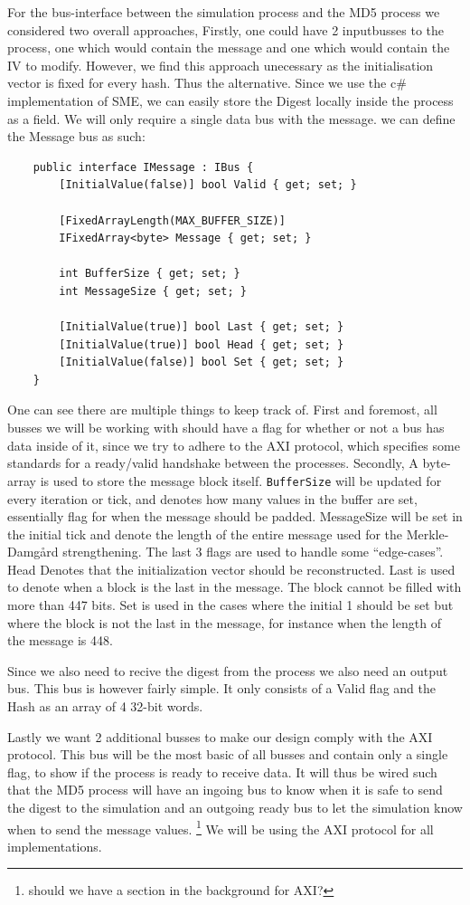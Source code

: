 \documentclass[a4paper]{article}
\begin{document}
For the bus-interface between the simulation process and the MD5 process we considered two overall approaches,
Firstly, one could have 2 inputbusses to the process, one which would contain the message and one which would contain the IV to modify. However, we find this approach unecessary as the initialisation vector is fixed for every hash. Thus the alternative. Since we use the c\# implementation of SME, we can easily store the Digest locally inside the process as a field. We will only require a single data bus with the message. we can define the Message bus as such:
\begin{verbatim}
    public interface IMessage : IBus {
        [InitialValue(false)] bool Valid { get; set; }

        [FixedArrayLength(MAX_BUFFER_SIZE)]
        IFixedArray<byte> Message { get; set; }

        int BufferSize { get; set; }
        int MessageSize { get; set; }

        [InitialValue(true)] bool Last { get; set; }
        [InitialValue(true)] bool Head { get; set; }
        [InitialValue(false)] bool Set { get; set; }
    }
\end{verbatim}
One can see there are multiple things to keep track of. First and foremost, all busses we will be working with should have a flag for whether or not a bus has data inside of it, since we try to adhere to the AXI protocol, which specifies some standards for a ready/valid handshake between the processes. Secondly, A byte-array is used to store the message block itself. \texttt{BufferSize} will be updated for every iteration or tick, and denotes how many values in the buffer are set, essentially flag for when the message should be padded. MessageSize will be set in the initial tick and denote the length of the entire message used for the Merkle-Damgård strengthening.
The last 3 flags are used to handle some ``edge-cases''.
Head Denotes that the initialization vector should be reconstructed.
Last is used to denote when a block is the last in the message. The block cannot be filled with more than 447 bits.
Set is used in the cases where the initial 1 should be set but where the block is not the last in the message, for instance when the length of the message is 448.

Since we also need to recive the digest from the process we also need an output bus. This bus is however fairly simple. It only consists of a Valid flag and the Hash as an array of 4 32-bit words.

Lastly we want 2 additional busses to make our design comply with the AXI protocol. This bus will be the most basic of all busses and contain only a single flag, to show if the process is ready to receive data. It will thus be wired such that the MD5 process will have an ingoing bus to know when it is safe to send the digest to the simulation and an outgoing ready bus to let the simulation know when to send the message values. \footnote{should we have a section in the background for AXI?} We will be using the AXI protocol for all implementations.
\end{document}
